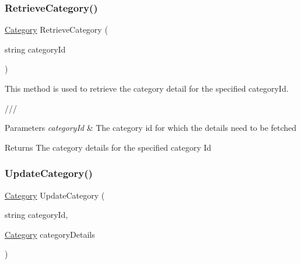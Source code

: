 \subsubsection{\texorpdfstring{Retrieve\+Category()}{RetrieveCategory()}}
{\footnotesize\ttfamily \hyperlink{classWildLifeTracker_1_1Models_1_1Category}{Category} Retrieve\+Category (\begin{DoxyParamCaption}\item[{string}]{category\+Id }\end{DoxyParamCaption})\hspace{0.3cm}{\ttfamily [inline]}}



This method is used to retrieve the category detail for the specified category\+Id. 

/// 
\begin{DoxyParams}{Parameters}
{\em category\+Id} & The category id for which the details need to be fetched\\
\hline
\end{DoxyParams}
\begin{DoxyReturn}{Returns}
The category details for the specified category Id
\end{DoxyReturn}
\mbox{\label{classWildLifeTracker_1_1Repository_1_1CategoryRepo_a1dfdbf9282dc67bc63171f404d89291c}} 
\subsubsection{\texorpdfstring{Update\+Category()}{UpdateCategory()}}
{\footnotesize\ttfamily \hyperlink{classWildLifeTracker_1_1Models_1_1Category}{Category} Update\+Category (\begin{DoxyParamCaption}\item[{string}]{category\+Id,  }\item[{\hyperlink{classWildLifeTracker_1_1Models_1_1Category}{Category}}]{category\+Details }\end{DoxyParamCaption})\hspace{0.3cm}{\ttfamily [inline]}}



